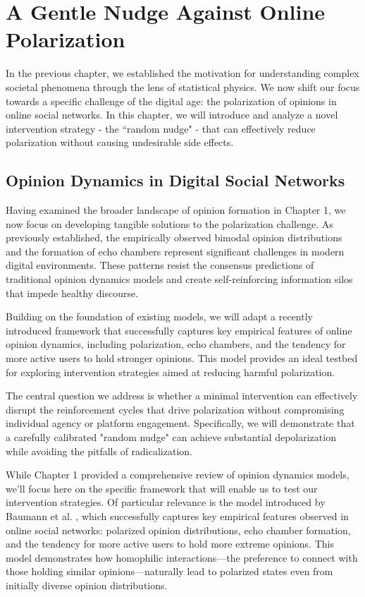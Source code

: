 \chapter{A Gentle Nudge Against Online Polarization}
\label{chap2}
In the previous chapter, we established the motivation for understanding complex societal phenomena through the lens of statistical physics. We now shift our focus towards a specific challenge of the digital age: the polarization of opinions in online social networks. In this chapter, we will introduce and analyze a novel intervention strategy - the ``random nudge" - that can effectively reduce polarization without causing undesirable side effects.
\section{Opinion Dynamics in Digital Social Networks}
Having examined the broader landscape of opinion formation in Chapter 1, we now focus on developing tangible solutions to the polarization challenge. As previously established, the empirically observed bimodal opinion distributions and the formation of echo chambers represent significant challenges in modern digital environments. These patterns resist the consensus predictions of traditional opinion dynamics models and create self-reinforcing information silos that impede healthy discourse.

Building on the foundation of existing models, we will adapt a recently introduced framework that successfully captures key empirical features of online opinion dynamics, including polarization, echo chambers, and the tendency for more active users to hold stronger opinions. This model provides an ideal testbed for exploring intervention strategies aimed at reducing harmful polarization.

The central question we address is whether a minimal intervention can effectively disrupt the reinforcement cycles that drive polarization without compromising individual agency or platform engagement. Specifically, we will demonstrate that a carefully calibrated "random nudge" can achieve substantial depolarization while avoiding the pitfalls of radicalization.

While Chapter 1 provided a comprehensive review of opinion dynamics models, we'll focus here on the specific framework that will enable us to test our intervention strategies. Of particular relevance is the model introduced by Baumann et al. \cite{modeling-echo-chambers-and-polarizaiton-dynamics-in-social-networks}, which successfully captures key empirical features observed in online social networks: polarized opinion distributions, echo chamber formation, and the tendency for more active users to hold more extreme opinions. This model demonstrates how homophilic interactions—the preference to connect with those holding similar opinions—naturally lead to polarized states even from initially diverse opinion distributions.

